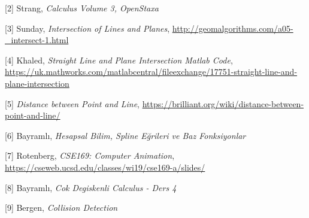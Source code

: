 \documentclass[12pt,fleqn]{article}\usepackage{../../common}
\begin{document}
[2] Strang, {\em Calculus Volume 3, OpenStaxa}

[3] Sunday, {\em Intersection of Lines and Planes}, 
\url{http://geomalgorithms.com/a05-_intersect-1.html}

[4] Khaled, {\em Straight Line and Plane Intersection Matlab Code}, 
\url{https://uk.mathworks.com/matlabcentral/fileexchange/17751-straight-line-and-plane-intersection}

[5] {\em Distance between Point and Line}, 
\url{https://brilliant.org/wiki/distance-between-point-and-line/}

[6] Bayramlı, {\em Hesapsal Bilim, Spline Eğrileri ve Baz Fonksiyonlar}

[7] Rotenberg, {\em CSE169: Computer Animation},
    \url{https://cseweb.ucsd.edu/classes/wi19/cse169-a/slides/}

[8] Bayramlı, {\em Cok Degiskenli Calculus - Ders 4}

[9] Bergen, {\em Collision Detection}
    
\end{document}

